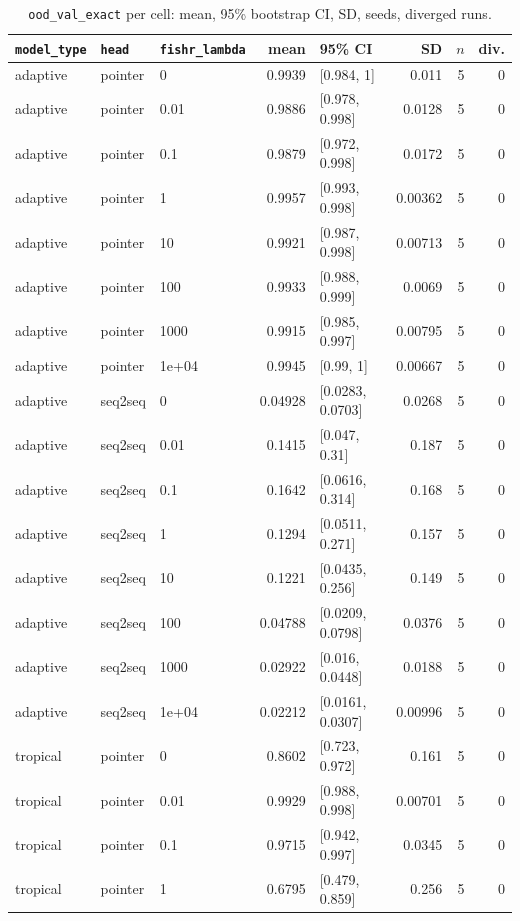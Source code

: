 \documentclass[10pt]{article}
\begin{document}
{\small
\begin{longtable}{lllrlrrr}
\caption{\texttt{ood\_val\_exact} per cell: mean, 95\% bootstrap CI, SD, seeds, diverged runs.}\label{tab:summary-ood_val_exact}\\
\toprule
\texttt{model\_type} & \texttt{head} & \texttt{fishr\_lambda} & mean & 95\% CI & SD & $n$ & div.\\
\midrule
\endhead
adaptive & pointer & 0 & 0.9939 & [0.984, 1] & 0.011 & 5 & 0\\
adaptive & pointer & 0.01 & 0.9886 & [0.978, 0.998] & 0.0128 & 5 & 0\\
adaptive & pointer & 0.1 & 0.9879 & [0.972, 0.998] & 0.0172 & 5 & 0\\
adaptive & pointer & 1 & 0.9957 & [0.993, 0.998] & 0.00362 & 5 & 0\\
adaptive & pointer & 10 & 0.9921 & [0.987, 0.998] & 0.00713 & 5 & 0\\
adaptive & pointer & 100 & 0.9933 & [0.988, 0.999] & 0.0069 & 5 & 0\\
adaptive & pointer & 1000 & 0.9915 & [0.985, 0.997] & 0.00795 & 5 & 0\\
adaptive & pointer & 1e+04 & 0.9945 & [0.99, 1] & 0.00667 & 5 & 0\\
adaptive & seq2seq & 0 & 0.04928 & [0.0283, 0.0703] & 0.0268 & 5 & 0\\
adaptive & seq2seq & 0.01 & 0.1415 & [0.047, 0.31] & 0.187 & 5 & 0\\
adaptive & seq2seq & 0.1 & 0.1642 & [0.0616, 0.314] & 0.168 & 5 & 0\\
adaptive & seq2seq & 1 & 0.1294 & [0.0511, 0.271] & 0.157 & 5 & 0\\
adaptive & seq2seq & 10 & 0.1221 & [0.0435, 0.256] & 0.149 & 5 & 0\\
adaptive & seq2seq & 100 & 0.04788 & [0.0209, 0.0798] & 0.0376 & 5 & 0\\
adaptive & seq2seq & 1000 & 0.02922 & [0.016, 0.0448] & 0.0188 & 5 & 0\\
adaptive & seq2seq & 1e+04 & 0.02212 & [0.0161, 0.0307] & 0.00996 & 5 & 0\\
tropical & pointer & 0 & 0.8602 & [0.723, 0.972] & 0.161 & 5 & 0\\
tropical & pointer & 0.01 & 0.9929 & [0.988, 0.998] & 0.00701 & 5 & 0\\
tropical & pointer & 0.1 & 0.9715 & [0.942, 0.997] & 0.0345 & 5 & 0\\
tropical & pointer & 1 & 0.6795 & [0.479, 0.859] & 0.256 & 5 & 0\\

\end{longtable}}
\end{document}
